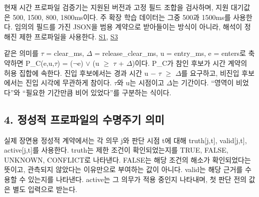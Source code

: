 \documentclass[11pt,a4paper]{article}
\begin{document}
현재 시간 프로파일 검증기는 지원된 버전과 고정 필드 조합을 검사하며, 지원 대기값은 500, 1500, 800, 1800ms이다. 주 확장 학습 데이터는 그중 500과 1500ms를 사용한다. 임의의 필드를 가진 JSON을 범용 계약으로 받아들이는 방식이 아니라, 해석이 정해진 제한 프로파일을 사용한다. \href{\detokenize{../../../../../../projects/04-guardsynth-coc/experiments/paper1_cnl_learning/temporal_preservation.py}}{S1}, \href{\detokenize{../../../../../../projects/04-guardsynth-coc/experiments/paper1_cnl_learning/temporal_training_data.py}}{S3}\par

같은 의미를 {\ttfamily\small \ensuremath{\tau} = clear\_ms}, {\ttfamily\small \ensuremath{\Delta} = release\_clear\_ms}, {\ttfamily\small u = entry\_ms}, {\ttfamily\small e = enters}로 축약하면 {\ttfamily\small P\_C(e,u,\ensuremath{\tau}) = (\ensuremath{\neg}e) \ensuremath{\lor} (u \ensuremath{\geq} \ensuremath{\tau} + \ensuremath{\Delta})}이다. P\_C가 참인 후보가 시간 계약의 허용 집합에 속한다. 진입 후보에서는 경과 시간 {\ttfamily\small u \ensuremath{-} \ensuremath{\tau} \ensuremath{\geq} \ensuremath{\Delta}}를 요구하고, 비진입 후보에서는 진입 시각에 무관하게 참이다. \ensuremath{\tau}와 u는 시점이고 \ensuremath{\Delta}는 기간이다. “영역이 비었다”와 “필요한 기간만큼 비어 있었다”를 구분하는 식이다.\par

\subsection*{4. 정성적 프로파일의 수명주기 의미}

실제 장면용 정성적 계약에서는 각 의무 j와 판단 시점 t에 대해 {\ttfamily\small truth[j,t]}, {\ttfamily\small valid[j,t]}, {\ttfamily\small active[j,t]}를 사용한다. {\ttfamily\small truth}는 제한 조건이 확인되었는지를 TRUE, FALSE, UNKNOWN, CONFLICT로 나타낸다. FALSE는 해당 조건의 해소가 확인되었다는 뜻이고, 관측되지 않았다는 이유만으로 부여하는 값이 아니다. {\ttfamily\small valid}는 해당 근거를 수용할 수 있는지를 나타낸다. {\ttfamily\small active}는 그 의무가 적용 중인지 나타내며, 첫 판단 전의 값은 별도 입력으로 받는다.\par
\end{document}
